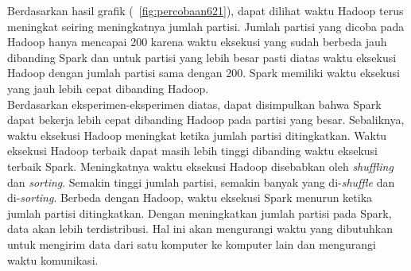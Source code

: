 Berdasarkan hasil grafik (~\ref{fig:percobaan621}), dapat dilihat waktu Hadoop terus meningkat seiring meningkatnya jumlah partisi. Jumlah partisi yang dicoba pada Hadoop hanya mencapai 200 karena waktu eksekusi yang sudah berbeda jauh dibanding Spark dan untuk partisi yang lebih besar pasti diatas waktu eksekusi Hadoop dengan jumlah partisi sama dengan 200. Spark memiliki waktu eksekusi yang jauh lebih cepat dibanding Hadoop. \\


Berdasarkan eksperimen-eksperimen diatas, dapat disimpulkan bahwa Spark dapat bekerja lebih cepat dibanding Hadoop pada partisi yang besar. Sebaliknya, waktu eksekusi Hadoop meningkat ketika jumlah partisi ditingkatkan. Waktu eksekusi Hadoop terbaik dapat masih lebih tinggi dibanding waktu eksekusi terbaik Spark. Meningkatnya waktu eksekusi Hadoop disebabkan oleh \textit{shuffling} dan \textit{sorting}. Semakin tinggi jumlah partisi, semakin banyak yang di-\textit{shuffle} dan di-\textit{sorting}. Berbeda dengan Hadoop, waktu eksekusi Spark menurun ketika jumlah partisi ditingkatkan. Dengan meningkatkan jumlah partisi pada Spark, data akan lebih terdistribusi. Hal ini akan mengurangi waktu yang dibutuhkan untuk mengirim data dari satu komputer ke komputer lain dan mengurangi waktu komunikasi.
